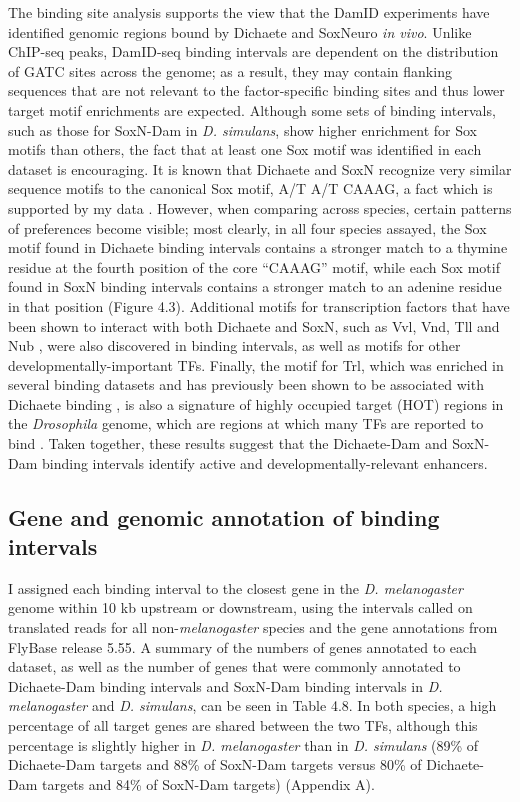 The binding site analysis supports the view that the DamID experiments have identified genomic regions bound by Dichaete and SoxNeuro \emph{in vivo}. Unlike ChIP-seq peaks, DamID-seq binding intervals are dependent on the distribution of GATC sites across the genome; as a result, they may contain flanking sequences that are not relevant to the factor-specific binding sites and thus lower target motif enrichments are expected. Although some sets of binding intervals, such as those for SoxN-Dam in \emph{D. simulans}, show higher enrichment for Sox motifs than others, the fact that at least one Sox motif was identified in each dataset is encouraging. It is known that Dichaete and SoxN recognize very similar sequence motifs to the canonical Sox motif, A/T A/T CAAAG, a fact which is supported by my data \citep{aleksic_role_2013,ferrero_soxneuro_2014}. However, when comparing across species, certain patterns of preferences become visible; most clearly, in all four species assayed, the Sox motif found in Dichaete binding intervals contains a stronger match to a thymine residue at the fourth position of the core “CAAAG” motif, while each Sox motif found in SoxN binding intervals contains a stronger match to an adenine residue in that position (Figure 4.3). Additional motifs for transcription factors that have been shown to interact with both Dichaete and SoxN, such as Vvl, Vnd, Tll and Nub \citep{aleksic_role_2013,ferrero_soxneuro_2014,soriano_drosophila_1998}, were also discovered in binding intervals, as well as motifs for other developmentally-important TFs. Finally, the motif for Trl, which was enriched in several binding datasets and has previously been shown to be associated with Dichaete binding \citep{aleksic_role_2013}, is also a signature of highly occupied target (HOT) regions in the \emph{Drosophila} genome, which are regions at which many TFs are reported to bind \citep{kvon_hot_2012}. Taken together, these results suggest that the Dichaete-Dam and SoxN-Dam binding intervals identify active and developmentally-relevant enhancers.

\subsection{Gene and genomic annotation of binding intervals}
I assigned each binding interval to the closest gene in the \emph{D. melanogaster} genome within 10 kb upstream or downstream, using the intervals called on translated reads for all non-\emph{melanogaster} species and the gene annotations from FlyBase release 5.55. A summary of the numbers of genes annotated to each dataset, as well as the number of genes that were commonly annotated to Dichaete-Dam binding intervals and SoxN-Dam binding intervals in \emph{D. melanogaster} and \emph{D. simulans}, can be seen in Table 4.8. In both species, a high percentage of all target genes are shared between the two TFs, although this percentage is slightly higher in \emph{D. melanogaster} than in \emph{D. simulans} (89\% of Dichaete-Dam targets and 88\% of SoxN-Dam targets versus 80\% of Dichaete-Dam targets and 84\% of SoxN-Dam targets) (Appendix A).

